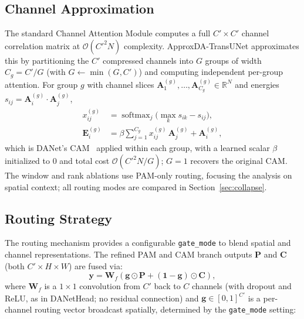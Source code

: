 \subsection{Channel Approximation}

The standard Channel Attention Module computes a full $C'{\times}C'$ channel correlation matrix at $\mathcal{O}(C'^2N)$ complexity. ApproxDA-TransUNet approximates this by partitioning the $C'$ compressed channels into $G$ groups of width $C_g = C'/G$ (with $G \leftarrow \min(G, C')$) and computing independent per-group attention. For group $g$ with channel slices $\mathbf{A}^{(g)}_1, \dots, \mathbf{A}^{(g)}_{C_g} \in \mathbb{R}^{N}$ and energies $s_{ij} = \mathbf{A}^{(g)}_i \cdot \mathbf{A}^{(g)}_j$,
\begin{equation}
\begin{aligned}
  x^{(g)}_{ij} &= \operatorname{softmax}_j\!\big(\max_k s_{ik} - s_{ij}\big), \\
  \mathbf{E}^{(g)}_i &= \beta \sum_{j=1}^{C_g} x^{(g)}_{ij}\,\mathbf{A}^{(g)}_j + \mathbf{A}^{(g)}_i,
\end{aligned}
  \label{eq:groupedcam}
\end{equation}
which is DANet's CAM~\cite{fu2019dual} applied within each group, with a learned scalar $\beta$ initialized to 0 and total cost $\mathcal{O}(C'^2N/G)$; $G{=}1$ recovers the original CAM. The window and rank ablations use PAM-only routing, focusing the analysis on spatial context; all routing modes are compared in Section~\ref{sec:collapse}.

\subsection{Routing Strategy}

The routing mechanism provides a configurable \texttt{gate\_mode} to blend spatial and channel representations. The refined PAM and CAM branch outputs $\mathbf{P}$ and $\mathbf{C}$ (both $C'{\times}H{\times}W$) are fused via:
\begin{equation}
  \mathbf{y} = \mathbf{W}_f\!\left(\mathbf{g} \odot \mathbf{P} + (\mathbf{1}-\mathbf{g}) \odot \mathbf{C}\right),
  \label{eq:fusion}
\end{equation}
where $\mathbf{W}_f$ is a $1{\times}1$ convolution from $C'$ back to $C$ channels (with dropout and ReLU, as in DANetHead; no residual connection) and $\mathbf{g} \in [0,1]^{C'}$ is a per-channel routing vector broadcast spatially, determined by the \texttt{gate\_mode} setting:

